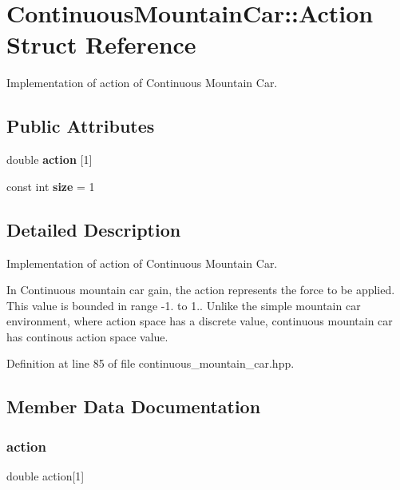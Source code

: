 \section{Continuous\+Mountain\+Car\+:\+:Action Struct Reference}
\label{structmlpack_1_1rl_1_1ContinuousMountainCar_1_1Action}


Implementation of action of Continuous Mountain Car.  


\subsection*{Public Attributes}
\begin{DoxyCompactItemize}
\item 
double \textbf{ action} [1]
\item 
const int \textbf{ size} = 1
\end{DoxyCompactItemize}


\subsection{Detailed Description}
Implementation of action of Continuous Mountain Car. 

In Continuous mountain car gain, the action represents the force to be applied. This value is bounded in range -\/1. to 1.. Unlike the simple mountain car environment, where action space has a discrete value, continuous mountain car has continous action space value. 

Definition at line 85 of file continuous\+\_\+mountain\+\_\+car.\+hpp.



\subsection{Member Data Documentation}
\mbox{\label{structmlpack_1_1rl_1_1ContinuousMountainCar_1_1Action_ab794acf36ef3d4b917753d5398116058}} 
\subsubsection{action}
{\footnotesize\ttfamily double action[1]}




